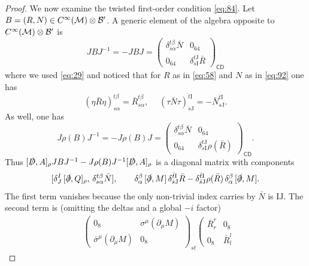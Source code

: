 \documentclass[11pt]{article}
\newcommand{\M}{\mathcal M}
\newcommand{\del}{\partial}
\newcommand{\sI}{\mathrm  I}
\newcommand{\sJ}{\mathrm J}
\newcommand{\sC}{\mathsf C}
\newcommand{\sD}{\mathsf D}
\begin{document}
\begin{proof}
We now examine the twisted first-order condition \eqref{eq:84}. Let
$B=(R,N)\in C^\infty(\M)\otimes {\cal B}'$. A generic element of the algebra opposite to $C^\infty(\M)\otimes{\cal B}'$ is
\begin{equation}
  \label{eq:299}
  J B J^{-1}= -J  B J=  \left(\begin{array}{cc}
\delta_{s\alpha}^{t\beta} \bar N& 0_{64}\\
0_{64} & \delta_{\dot s \sI}^{\dot t \sJ} \bar R
\end{array}\right)_{\sC\sD}
\end{equation}
where we used \eqref{eq:29} and noticed that for $R$ as in
\eqref{eq:58} and $N$ as in \eqref{eq:92} one has
\begin{equation}
   \label{eq:31-Bis}
 (\eta \bar R\eta)_{s\alpha}^{ t\beta}  = \bar R_{s\alpha}^{ t\beta} ,\; \quad
 (\tau\bar N\tau)_{\dot s\sJ}^{\dot t\sI}= - \bar N_{\dot s\sJ}^{\dot t\sI}.
 \end{equation}
As well, one has
\begin{equation}
  \label{eq:290}
  J \rho(B) J^{-1}= -J  \rho(B)  J=  \left(\begin{array}{cc}
\delta_{s\alpha}^{t\beta} \bar N& 0_{64}\\
0_{64} & \delta_{\dot s \sI}^{\dot t \sJ} \rho(\bar R)
\end{array}\right)_{\sC\sD}.
\end{equation}
Thus $[\slashed D, A]_\rho JBJ^{-1} - J\rho(B)J^{-1}   [\slashed D,
A]_\rho$ is a diagonal matrix with components
\begin{equation}
  \label{eq:119}
  [\delta^I_J \,[\slashed\del,  Q]_\rho,\, \delta_{s\alpha}^{t\beta} \bar
  N],\quad\quad  \delta^\beta_\alpha \,[\slashed\del,  M]\, \delta^{\dot t
    \sI}_{\dot s \sJ}\bar R - \delta^{\dot t
    \sI}_{\dot s \sJ}\rho(\bar R) \,\delta^\beta_\alpha \,[\slashed\del,  M].
\end{equation}
The first term vanishes because the only non-trivial index carries by
$\bar N$ is $\sI\sJ$. The
second term is (omitting the deltas and a global $-i$ factor) 
\begin{align}
\nonumber
&\left(
  \begin{array}{cc} 
    0_8 & \sigma^\mu(\del_\mu M)\\ 
    {\bar \sigma}^\mu(\del_\mu M) & 0_8
  \end{array}
\right)_{st} 
\left(
  \begin{array}{cc} 
    \bar R_r^r & 0_8\\ 
    0_8& \bar R_l^l

\end{array}
\end{align}
\end{proof}
\end{document}
